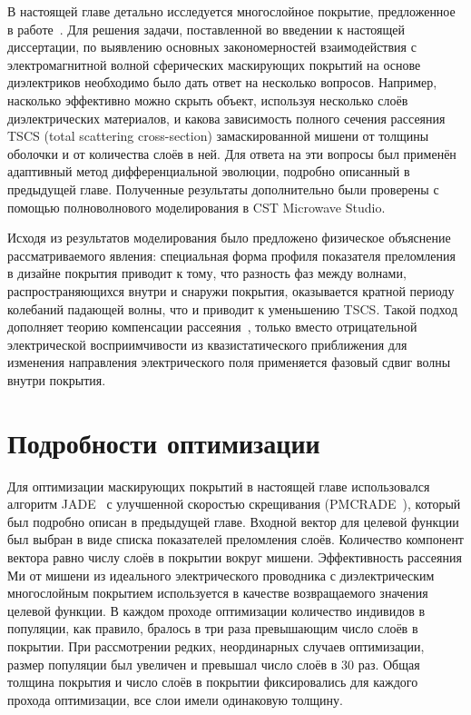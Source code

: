 В настоящей главе детально исследуется многослойное покрытие,
предложенное в работе~\cite{Semouchkina-2013}. Для решения задачи,
поставленной во введении к настоящей диссертации, по выявлению
основных закономерностей взаимодействия с электромагнитной волной
сферических маскирующих покрытий на основе диэлектриков необходимо
было дать ответ на несколько вопросов. Например, насколько эффективно
можно скрыть объект, используя несколько слоёв диэлектрических
материалов, и какова зависимость полного сечения рассеяния TSCS (total
scattering cross-section) замаскированной мишени от толщины оболочки и
от количества слоёв в ней. Для ответа на эти вопросы был применён
адаптивный метод дифференциальной эволюции, подробно описанный в
предыдущей главе. Полученные результаты дополнительно были проверены с
помощью полноволнового моделирования в CST Microwave
Studio.\cite{CST-web}
 
Исходя из результатов моделирования было предложено физическое
объяснение рассматриваемого явления: специальная форма профиля
показателя преломления в дизайне покрытия приводит к тому, что
разность фаз между волнами, распространяющихся внутри и снаружи
покрытия, оказывается кратной периоду колебаний падающей волны, что и
приводит к уменьшению TSCS. Такой подход дополняет теорию компенсации
рассеяния~\cite{alu}, только вместо отрицательной электрической
восприимчивости из квазистатического приближения для изменения
направления электрического поля применяется фазовый сдвиг волны
внутри покрытия.

\section{Подробности оптимизации}
Для оптимизации маскирующих покрытий в настоящей главе использовался
алгоритм JADE~\cite{Jingqiao-JADE-2009} с улучшенной скоростью
скрещивания (PMCRADE~\cite{Jie-PMCRADE-2011}), который был подробно
описан в предыдущей главе.  Входной вектор для целевой функции был
выбран в виде списка показателей преломления слоёв. Количество
компонент вектора равно числу слоёв в покрытии вокруг
мишени. Эффективность рассеяния Ми от мишени из идеального
электрического проводника с диэлектрическим многослойным покрытием
используется в качестве возвращаемого значения целевой функции. В
каждом проходе оптимизации количество индивидов в популяции, как
правило, бралось в три раза превышающим число слоёв в покрытии. При
рассмотрении редких, неординарных случаев оптимизации, размер
популяции был увеличен и превышал число слоёв в 30 раз. Общая толщина
покрытия и число слоёв в покрытии фиксировались для каждого прохода
оптимизации, все слои имели одинаковую толщину.
 

